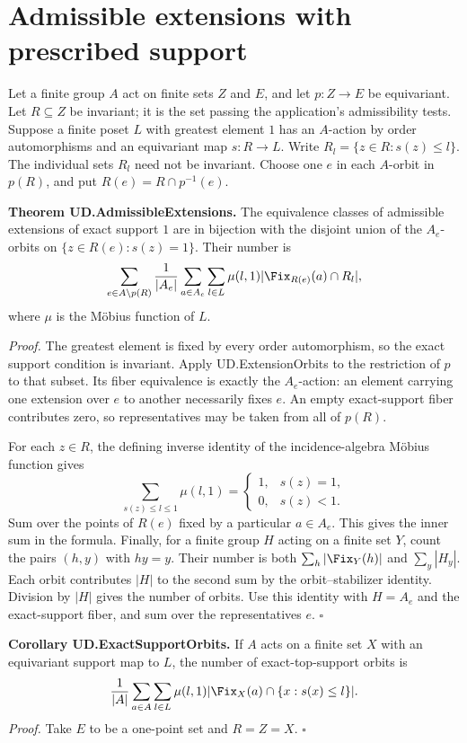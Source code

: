 \section{Admissible extensions with prescribed support}
Let a finite group $A$ act on finite sets $Z$ and $E$, and let
$p:Z\to E$ be equivariant. Let $R\subseteq Z$ be invariant; it is the set
passing the application's admissibility tests. Suppose a finite poset $L$
with greatest element $1$ has an $A$-action by order automorphisms and an
equivariant map $s:R\to L$. Write $R_l=\{z\in R:s(z)\le l\}$.
The individual sets $R_l$ need not be invariant. Choose one $e$ in each
$A$-orbit in $p(R)$, and put $R(e)=R\cap p^{-1}(e)$.

\textbf{Theorem UD.AdmissibleExtensions.}
The equivalence classes of admissible extensions of exact support $1$ are
in bijection with the disjoint union of the $A_e$-orbits on
$\{z\in R(e):s(z)=1\}$. Their number is
\[
 \sum_{e\in A\backslash p(R)}\frac1{|A_e|}
 \sum_{a\in A_e}\sum_{l\in L}\mu(l,1)
       |\Fix_{R(e)}(a)\cap R_l|,
\]
where $\mu$ is the M\"obius function of $L$.

\emph{Proof.}
The greatest element is fixed by every order automorphism, so the exact
support condition is invariant. Apply UD.ExtensionOrbits to the restriction
of $p$ to that subset. Its fiber equivalence is exactly the $A_e$-action:
an element carrying one extension over $e$ to another necessarily fixes $e$.
An empty exact-support fiber contributes zero, so representatives may be
taken from all of $p(R)$.

For each $z\in R$, the defining inverse identity of the incidence-algebra
M\"obius function gives
\[
 \sum_{s(z)\le l\le1}\mu(l,1)=
 \begin{cases}1,&s(z)=1,\\0,&s(z)<1.\end{cases}
\]
Sum over the points of $R(e)$ fixed by a particular $a\in A_e$. This gives
the inner sum in the formula. Finally, for a finite group $H$ acting on a
finite set $Y$, count the pairs $(h,y)$ with $hy=y$. Their number is both
$\sum_h|\Fix_Y(h)|$ and $\sum_y|H_y|$. Each orbit contributes $|H|$ to the
second sum by the orbit--stabilizer identity. Division by $|H|$ gives the
number of orbits. Use this identity with $H=A_e$ and the exact-support
fiber, and sum over the representatives $e$. \(\square\)

\textbf{Corollary UD.ExactSupportOrbits.}
If $A$ acts on a finite set $X$ with an equivariant support map to $L$,
the number of exact-top-support orbits is
\[
 \frac1{|A|}\sum_{a\in A}\sum_{l\in L}
       \mu(l,1)|\Fix_X(a)\cap\{x:s(x)\le l\}|.
\]
\emph{Proof.} Take $E$ to be a one-point set and $R=Z=X$.
\(\square\)


